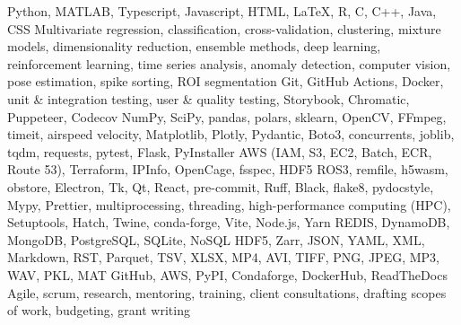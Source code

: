 \begin{rubric}{}
%
    Python, MATLAB, Typescript, Javascript, HTML, LaTeX, R, C, C++, Java, CSS
%
    Multivariate regression, classification, cross-validation, clustering, mixture models,
dimensionality reduction, ensemble methods, deep learning, reinforcement learning, time series analysis, anomaly detection, computer vision, pose estimation, spike sorting, ROI segmentation
%
\entry*[DevOps]
    Git, GitHub Actions, Docker, unit \& integration testing, user \& quality testing, Storybook, Chromatic, Puppeteer, Codecov
%
\entry*[Libraries]
    NumPy, SciPy, pandas, polars, sklearn, OpenCV, FFmpeg, timeit, airspeed velocity, Matplotlib, Plotly, Pydantic, Boto3, concurrents, joblib, tqdm, requests, pytest, Flask, PyInstaller
%
    AWS (IAM, S3, EC2, Batch, ECR, Route 53), Terraform, IPInfo, OpenCage, fsspec, HDF5 ROS3, remfile, h5wasm,
    obstore, Electron, Tk, Qt, React, pre-commit, Ruff, Black, flake8, pydocstyle, Mypy, Prettier, multiprocessing,
    threading, high-performance computing (HPC), Setuptools, Hatch, Twine, conda-forge, Vite, Node.js, Yarn
%
\entry*[Databases]
    REDIS, DynamoDB, MongoDB, PostgreSQL, SQLite, NoSQL
%
    HDF5, Zarr, JSON, YAML, XML, Markdown, RST, Parquet, TSV, XLSX, MP4, AVI, TIFF, PNG, JPEG, MP3, WAV, PKL, MAT
%
\entry*[Administration]
    GitHub, AWS, PyPI, Condaforge, DockerHub, ReadTheDocs
%
    Agile, scrum, research, mentoring, training, client consultations, drafting scopes of work, budgeting, grant writing
%
\end{rubric}
